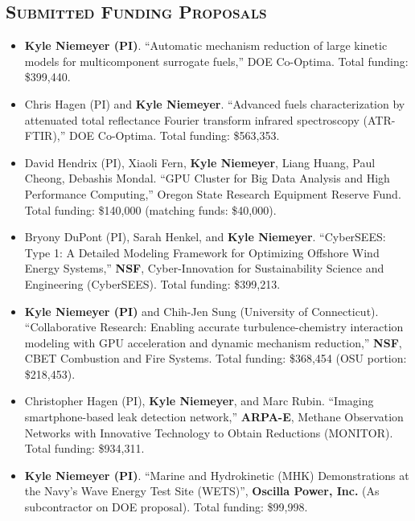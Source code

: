 \documentclass[margin,line,11pt]{res}
\begin{document}
\begin{resume}
\section{\textsc{Submitted Funding Proposals}}

\begin{itemize}[leftmargin=*]

\item \textbf{Kyle Niemeyer (PI)}.
``Automatic mechanism reduction of large kinetic models for multicomponent surrogate fuels,''
DOE Co-Optima.
Total funding: \$399,440.

\item Chris Hagen (PI) and \textbf{Kyle Niemeyer}.
``Advanced fuels characterization by attenuated total reflectance Fourier transform infrared spectroscopy (ATR-FTIR),''
DOE Co-Optima.
Total funding: \$563,353.

\item David Hendrix (PI), Xiaoli Fern, \textbf{Kyle Niemeyer}, Liang Huang, Paul Cheong, Debashis Mondal.
``GPU Cluster for Big Data Analysis and High Performance Computing,''
Oregon State Research Equipment Reserve Fund.
Total funding: \$140,000 (matching funds: \$40,000).

\item Bryony DuPont (PI), Sarah Henkel, and \textbf{Kyle Niemeyer}.
``CyberSEES: Type 1: A Detailed Modeling Framework for Optimizing Offshore Wind Energy Systems,''
\textbf{NSF}, Cyber-Innovation for Sustainability Science and Engineering (CyberSEES).
Total funding: \$399,213.

\item \textbf{Kyle Niemeyer (PI)} and Chih-Jen Sung (University of Connecticut).
``Collaborative Research: Enabling accurate turbulence-chemistry interaction modeling with GPU acceleration and dynamic mechanism reduction,''
\textbf{NSF}, CBET Combustion and Fire Systems.
Total funding: \$368,454 (OSU portion: \$218,453).

\item Christopher Hagen (PI), \textbf{Kyle Niemeyer}, and Marc Rubin.
``Imaging smartphone-based leak detection network,''
\textbf{ARPA-E}, Methane Observation Networks with Innovative Technology to Obtain Reductions (MONITOR).
Total funding: \$934,311.

\item \textbf{Kyle Niemeyer (PI)}.
``Marine and Hydrokinetic (MHK) Demonstrations at the Navy's Wave Energy Test Site (WETS)'',
\textbf{Oscilla Power, Inc.} (As subcontractor on DOE proposal).
Total funding: \$99,998.


\end{itemize}
\end{resume}
\end{document}
